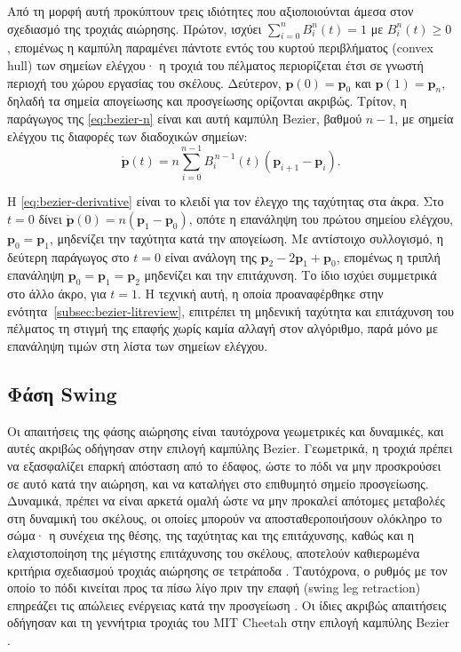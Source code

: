 \documentclass[11pt]{report}
\begin{document}
Από τη μορφή αυτή προκύπτουν τρεις ιδιότητες που αξιοποιούνται άμεσα στον
σχεδιασμό της τροχιάς αιώρησης. Πρώτον, ισχύει
$\sum_{i=0}^{n} B_i^{n}(t) = 1$ με $B_i^{n}(t) \geq 0$, επομένως η καμπύλη
παραμένει πάντοτε εντός του κυρτού περιβλήματος (convex hull) των σημείων
ελέγχου· η τροχιά του πέλματος περιορίζεται έτσι σε γνωστή περιοχή του χώρου
εργασίας του σκέλους. Δεύτερον, $\mathbf{p}(0) = \mathbf{p}_0$ και
$\mathbf{p}(1) = \mathbf{p}_n$, δηλαδή τα σημεία απογείωσης και προσγείωσης
ορίζονται ακριβώς. Τρίτον, η παράγωγος της \eqref{eq:bezier-n} είναι και αυτή
καμπύλη Bezier, βαθμού $n-1$, με σημεία ελέγχου τις διαφορές των διαδοχικών
σημείων:
\begin{equation}
\dot{\mathbf{p}}(t) = n \sum_{i=0}^{n-1} B_i^{\,n-1}(t)
\left(\mathbf{p}_{i+1} - \mathbf{p}_i\right).
\label{eq:bezier-derivative}
\end{equation}

Η \eqref{eq:bezier-derivative} είναι το κλειδί για τον έλεγχο της ταχύτητας στα
άκρα. Στο $t = 0$ δίνει $\dot{\mathbf{p}}(0) = n(\mathbf{p}_1 - \mathbf{p}_0)$,
οπότε η επανάληψη του πρώτου σημείου ελέγχου, $\mathbf{p}_0 = \mathbf{p}_1$,
μηδενίζει την ταχύτητα κατά την απογείωση. Με αντίστοιχο συλλογισμό, η δεύτερη
παράγωγος στο $t = 0$ είναι ανάλογη της
$\mathbf{p}_2 - 2\mathbf{p}_1 + \mathbf{p}_0$, επομένως η τριπλή επανάληψη
$\mathbf{p}_0 = \mathbf{p}_1 = \mathbf{p}_2$ μηδενίζει και την επιτάχυνση. Το
ίδιο ισχύει συμμετρικά στο άλλο άκρο, για $t = 1$. Η τεχνική αυτή, η οποία
προαναφέρθηκε στην ενότητα~\ref{subsec:bezier-litreview}, επιτρέπει τη μηδενική
ταχύτητα και επιτάχυνση του πέλματος τη στιγμή της επαφής χωρίς καμία αλλαγή
στον αλγόριθμο, παρά μόνο με επανάληψη τιμών στη λίστα των σημείων ελέγχου.

\subsection{Φάση Swing}
\label{subsec:swing-phase}
Οι απαιτήσεις της φάσης αιώρησης είναι ταυτόχρονα γεωμετρικές και δυναμικές, και
αυτές ακριβώς οδήγησαν στην επιλογή καμπύλης Bezier. Γεωμετρικά, η τροχιά πρέπει
να εξασφαλίζει επαρκή απόσταση από το έδαφος, ώστε το πόδι να μην προσκρούσει σε
αυτό κατά την αιώρηση, και να καταλήγει στο επιθυμητό σημείο προσγείωσης.
Δυναμικά, πρέπει να είναι αρκετά ομαλή ώστε να μην προκαλεί απότομες μεταβολές
στη δυναμική του σκέλους, οι οποίες μπορούν να αποσταθεροποιήσουν ολόκληρο το
σώμα· η συνέχεια της θέσης, της ταχύτητας και της επιτάχυνσης, καθώς και η
ελαχιστοποίηση της μέγιστης επιτάχυνσης του σκέλους, αποτελούν καθιερωμένα
κριτήρια σχεδιασμού τροχιάς αιώρησης σε τετράποδα \cite{zeng_leg_2019}.
Ταυτόχρονα, ο ρυθμός με τον οποίο το πόδι κινείται προς τα πίσω λίγο πριν την
επαφή (swing leg retraction) επηρεάζει τις απώλειες ενέργειας κατά την
προσγείωση \cite{haberland}. Οι ίδιες ακριβώς απαιτήσεις οδήγησαν και τη
γεννήτρια τροχιάς του MIT Cheetah στην επιλογή καμπύλης Bezier
\cite{hyun_high_2014}.
\end{document}
